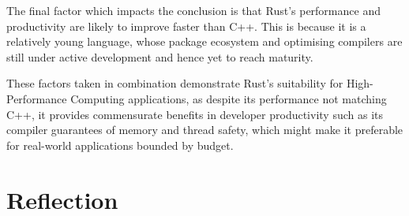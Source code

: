 
The final factor which impacts the conclusion is that Rust's performance and productivity are likely to improve faster than C++. This is because it is a relatively young language, whose package ecosystem and optimising compilers are still under active development and hence yet to reach maturity.

These factors taken in combination demonstrate Rust's suitability for High-Performance Computing applications, as despite its performance not matching C++, it provides commensurate benefits in developer productivity such as its compiler guarantees of memory and thread safety, which might make it preferable for real-world applications bounded by budget.




\section{Reflection}
\label{sec:reflection}


